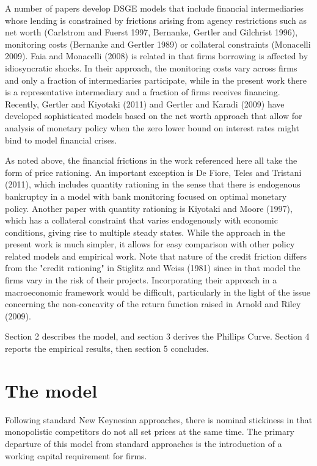 \documentclass{article}
\begin{document}
A number of papers develop DSGE models that include financial intermediaries
whose lending is constrained by frictions arising from agency restrictions
such as net worth (Carlstrom and Fuerst 1997, Bernanke, Gertler and
Gilchrist 1996), monitoring costs (Bernanke and Gertler 1989) or collateral
constraints (Monacelli 2009). Faia and Monacelli (2008) is related in that
firms borrowing is affected by idiosyncratic shocks. In their approach, the
monitoring costs vary across firms and only a fraction of intermediaries
participate, while in the present work there is a representative
intermediary and a fraction of firms receives financing. Recently, Gertler
and Kiyotaki (2011) and Gertler and Karadi (2009) have developed
sophisticated models based on the net worth approach that allow for analysis
of monetary policy when the zero lower bound on interest rates might bind to
model financial crises.

As noted above, the financial frictions in the work referenced here all take
the form of price rationing. An important exception is De Fiore, Teles and
Tristani (2011), which includes quantity rationing in the sense that there
is endogenous bankruptcy in a model with bank monitoring focused on optimal
monetary policy. Another paper with quantity rationing is Kiyotaki and
Moore (1997), which has a collateral constraint that varies endogenously
with economic conditions, giving rise to multiple steady states. While the
approach in the present work is much simpler, it allows for easy comparison
with other policy related models and empirical work. Note that nature of the
credit friction differs from the "credit rationing" in Stiglitz and Weiss
(1981) since in that model the firms vary in the risk of their projects.
Incorporating their approach in a macroeconomic framework would be
difficult, particularly in the light of the issue concerning the
non-concavity of the return function raised in Arnold and Riley (2009).

Section 2 describes the model, and section 3 derives the Phillips Curve.
Section 4 reports the empirical results, then section 5 concludes.

\section{The model}

Following standard New Keynesian approaches, there is nominal stickiness in
that monopolistic competitors do not all set prices at the same time. The
primary departure of this model from standard approaches is the introduction
of a working capital requirement for firms.
\end{document}
